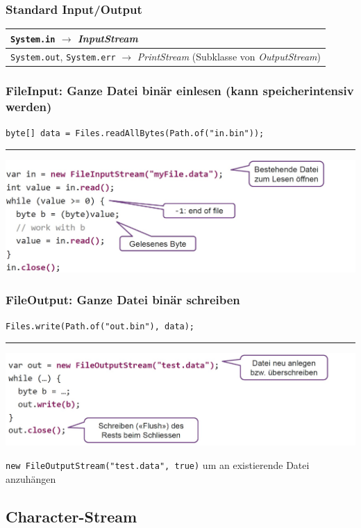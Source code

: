 {    \subsubsection{Standard Input/Output}
        \begin{tabular}{l}
            \verb|System.in| $\rightarrow$  \textit{InputStream}\\\hline
            \verb|System.out|, \verb|System.err| $\rightarrow$ \textit{PrintStream} {\footnotesize(Subklasse von \textit{OutputStream})}\\
        \end{tabular}
        \vspace{-0.3cm}

    \subsubsection{FileInput: Ganze Datei binär einlesen (kann speicherintensiv werden)}
        \verb|byte[] data = Files.readAllBytes(Path.of("in.bin"));|
        \hrule
        \includegraphics[width=0.85\linewidth]{pictures/file-in.jpg}
        \vspace{-0.2cm}

    \subsubsection{FileOutput: Ganze Datei binär schreiben}
        \verb|Files.write(Path.of("out.bin"), data);|
        \hrule
        \includegraphics[width=0.85\linewidth]{pictures/file-out.jpg}

        \verb|new FileOutputStream("test.data", true)| um an existierende Datei anzuhängen
        \vspace{-0.2cm}

\subsection{Character-Stream}
}
